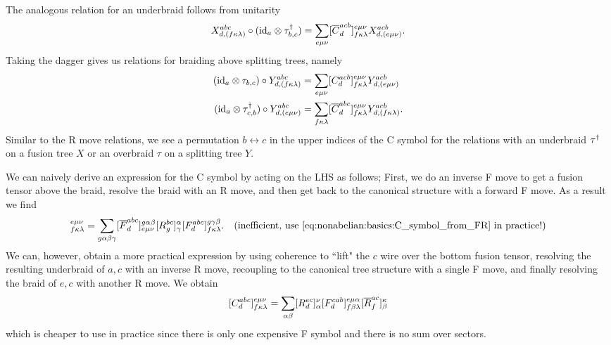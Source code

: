 The analogous relation for an underbraid follows from unitarity
\begin{equation}
    X^{abc}_{d,({f\kappa\lambda})} \circ (\mathrm{id}_{a} \otimes \tau_{b,c}^\dagger)
    = \sum_{{e\mu\nu}} [ \overline{C}^{acb}_d ]^{{e\mu\nu}}_{{f\kappa\lambda}} X^{acb}_{d,({e\mu\nu})}
    .
\end{equation}
%
Taking the dagger gives us relations for braiding above splitting trees, namely
\begin{align}
    (\mathrm{id}_{a} \otimes \tau_{b,c}) \circ Y^{abc}_{d,({f\kappa\lambda})}
    &= \sum_{{e\mu\nu}} [ C^{acb}_d ]^{{e\mu\nu}}_{{f\kappa\lambda}} Y^{acb}_{d,({e\mu\nu})}
    \\
    (\mathrm{id}_{a} \otimes \tau_{c,b}^\dagger) \circ Y^{abc}_{d,({e\mu\nu})}
    &= \sum_{f\kappa\lambda} [ \overline{C}^{abc}_d ]^{{e\mu\nu}}_{{f\kappa\lambda}} Y^{acb}_{d,({f\kappa\lambda})}
    .
\end{align}
Similar to the R move relations, we see a permutation $b \leftrightarrow c$ in the upper indices of the C symbol for the relations with an underbraid $\tau^\dagger$ on a fusion tree $X$ or an overbraid $\tau$ on a splitting tree $Y$.

We can naively derive an expression for the C symbol by acting on the LHS as follows;
First, we do an inverse F move to get a fusion tensor above the braid, resolve the braid with an R move, and then get back to the canonical structure with a forward F move.
%
As a result we find
\begin{equation}
    [ C^{abc}_d ]^{{e\mu\nu}}_{{f\kappa\lambda}}
    = \sum_{g\alpha\beta\gamma} 
        [ \conj{F}^{abc}_d ]^{g\alpha\beta}_{{e\mu\nu}}
        [ R^{bc}_g ]^{\alpha}_{\gamma}
        [ F^{abc}_d ]^{g\gamma\beta}_{{f\kappa\lambda}}
    .
    \quad \text{(inefficient, use~\eqref{eq:nonabelian:basics:C_symbol_from_FR} in practice!)}
\end{equation}
%
We can, however, obtain a more practical expression by using coherence to ``lift" the $c$ wire over the bottom fusion tensor, resolving the resulting underbraid of $a,c$ with an inverse R move, recoupling to the canonical tree structure with a single F move, and finally resolving the braid of $e, c$ with another R move.
%
We obtain
\begin{equation}
    \label{eq:nonabelian:basics:C_symbol_from_FR}
    [ C^{abc}_d ]^{{e\mu\nu}}_{{f\kappa\lambda}}
    = \sum_{\alpha\beta} 
        [ R^{ec}_d ]^{\nu}_{\alpha}
        [ F^{cab}_d ]^{e\mu\alpha}_{f\beta\lambda}
        [ \overline{R}^{ac}_f ]^{\kappa}_{{\beta}}
\end{equation}
which is cheaper to use in practice since there is only one expensive F symbol and there is no sum over sectors.

